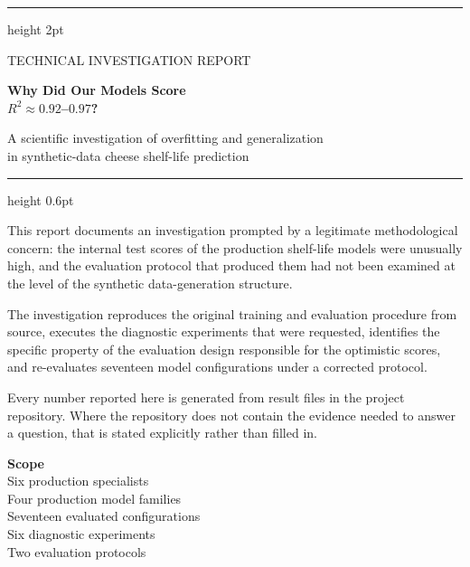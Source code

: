 \documentclass[11pt,a4paper]{report}
\newcommand{\rsq}{R^2}
\begin{document}
\begin{titlepage}
\thispagestyle{empty}
\vspace*{1.1cm}
{\color{burglight}\hrule height 2pt}
\vspace{1.0cm}

{\noindent\footnotesize\sffamily\color{softgrey}\MakeUppercase{Technical investigation report}\par}
\vspace{0.7cm}

{\noindent\huge\bfseries\color{burgundy} Why Did Our Models Score\\[2pt]
$\rsq \approx 0.92$--$0.97$?\par}
\vspace{0.45cm}
{\noindent\Large\color{ink} A scientific investigation of overfitting and generalization\\[3pt]
in synthetic-data cheese shelf-life prediction\par}

\vspace{1.0cm}
{\color{rulegrey}\hrule height 0.6pt}
\vspace{0.8cm}

\noindent\begin{minipage}{0.62\textwidth}
\small
This report documents an investigation prompted by a legitimate
methodological concern: the internal test scores of the production
shelf-life models were unusually high, and the evaluation protocol that
produced them had not been examined at the level of the synthetic
data-generation structure.

\smallskip
The investigation reproduces the original training and evaluation
procedure from source, executes the diagnostic experiments that were
requested, identifies the specific property of the evaluation design
responsible for the optimistic scores, and re-evaluates seventeen model
configurations under a corrected protocol.

\smallskip
Every number reported here is generated from result files in the project
repository. Where the repository does not contain the evidence needed to
answer a question, that is stated explicitly rather than filled in.
\end{minipage}
\hfill
\noindent\begin{minipage}{0.32\textwidth}
\footnotesize\color{softgrey}
\textbf{\color{burgundy}Scope}\\
Six production specialists\\
Four production model families\\
Seventeen evaluated configurations\\
Six diagnostic experiments\\
Two evaluation protocols


\end{minipage}
\end{titlepage}
\end{document}
